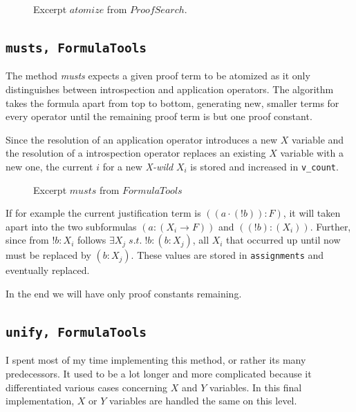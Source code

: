 \begin{figure}[H]
	\caption{Excerpt $atomize$ from $ProofSearch$.}
    \vspace{-10pt}
	
	\vspace{-10pt}
\end{figure}

\subsection[musts]{\texttt{musts, FormulaTools}}
The method \emph{musts} expects a given proof term to be atomized as it only distinguishes between introspection and application operators.
The algorithm takes the formula apart from top to bottom, generating new, smaller terms for every operator until the remaining proof term is but one proof constant. 

Since the resolution of an application operator introduces a new $X$ variable and the resolution of a introspection operator replaces an existing $X$ variable with a new one, the current $i$ for a new \emph{X-wild} $X_i$ is stored and increased in \texttt{v\_count}.

\begin{figure}[H]
	\caption{Excerpt $musts$ from $FormulaTools$}
    \vspace{-10pt}
	
	\vspace{-10pt}
\end{figure}

If for example the current justification term is $((a\cdot (!b)):F)$, it will taken apart into the two subformulas $(a:(X_i\rightarrow F))$ and $((!b):(X_i))$. Further, since from $!b:X_i$ follows $\exists X_j \; s.t. \; !b:(b:X_j)$, all $X_i$ that occurred up until now must be replaced by $(b:X_j)$. These values are stored in \texttt{assignments} and eventually replaced.

In the end we will have only proof constants remaining.

\subsection[unify]{\texttt{unify, FormulaTools}}
I spent most of my time implementing this method, or rather its many predecessors. It used to be a lot longer and more complicated because it differentiated various cases concerning $X$ and $Y$ variables. In this final implementation, $X$ or $Y$ variables are handled the same on this level.

